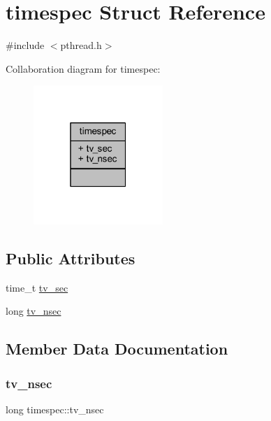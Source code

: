 \hypertarget{structtimespec}{}\section{timespec Struct Reference}
\label{structtimespec}


{\ttfamily \#include $<$pthread.\+h$>$}



Collaboration diagram for timespec\+:
\nopagebreak
\begin{figure}[H]
\begin{center}
\leavevmode
\includegraphics[width=139pt]{structtimespec__coll__graph}
\end{center}
\end{figure}
\subsection*{Public Attributes}
\begin{DoxyCompactItemize}
\item 
time\+\_\+t \mbox{\hyperlink{structtimespec_afc3302668d7cb5952f590da69fdd4955}{tv\+\_\+sec}}
\item 
long \mbox{\hyperlink{structtimespec_ae3c7510dafa8cbcaede866ed13c99683}{tv\+\_\+nsec}}
\end{DoxyCompactItemize}


\subsection{Member Data Documentation}
\mbox{\label{structtimespec_ae3c7510dafa8cbcaede866ed13c99683}} 
\subsubsection{\texorpdfstring{tv\+\_\+nsec}{tv\_nsec}}
{\footnotesize\ttfamily long timespec\+::tv\+\_\+nsec}


